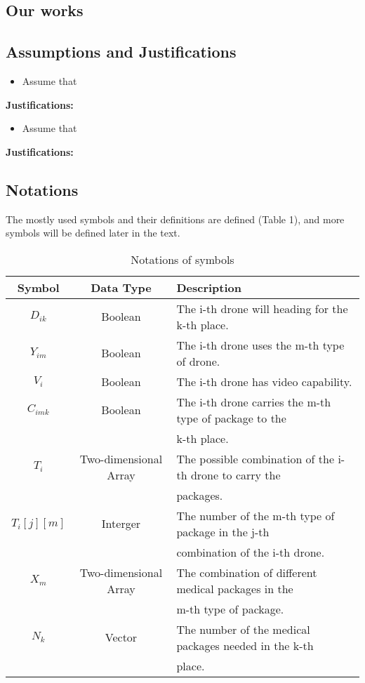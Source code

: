 \subsection{Our works}


\subsection{Assumptions and Justifications} 

\begin{itemize}
    \item Assume that 
\end{itemize}

\textbf{Justifications: }

\begin{itemize}
    \item Assume that 
\end{itemize}

\textbf{Justifications: }


\subsection{Notations}
The mostly used symbols and their definitions are defined (Table 1), and more symbols will be defined later in the text. 
\begin{table}[h] \centering
    \caption{Notations of symbols}
    \begin{tabular}{ccl}
        \toprule
        Symbol & Data Type & Description\\ \hline
        $D_{ik}$ & Boolean & The i-th drone will heading for the k-th place. \\
        $Y_{im}$ & Boolean & The i-th drone uses the m-th type of drone. \\
        $V_i$ & Boolean & The i-th drone has video capability. \\
        $C_{imk}$ & Boolean & The i-th drone carries the m-th type of package to the\\ & & k-th place.\\
        $T_i$ & Two-dimensional Array & The possible combination of the i-th drone to carry the\\ & &packages.\\
        $T_i[j][m]$ & Interger & The number of the m-th type of package in the j-th\\ & & combination of the i-th drone.\\
        $X_m$ & Two-dimensional Array & The combination of different medical packages in the\\ & & m-th type of package. \\
        $N_k$ & Vector & The number of the medical packages needed in the k-th \\ & & place.\\
        \bottomrule
    \end{tabular}
\end{table}



